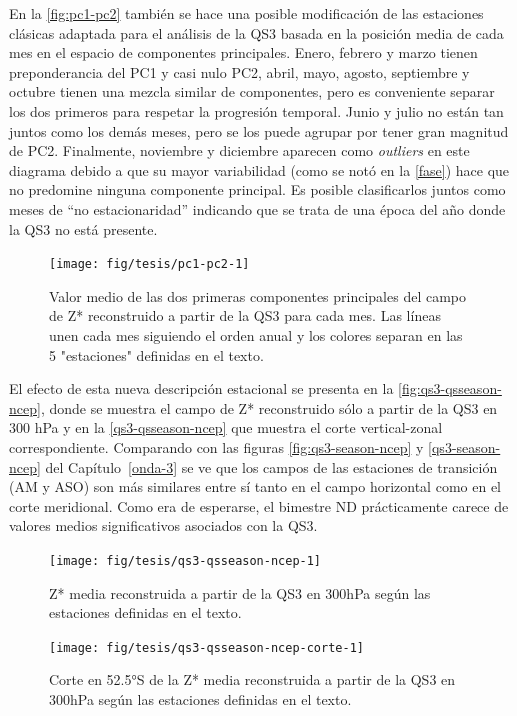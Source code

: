 \documentclass[spanish,a4paper,12pt,oneside]{book}
\begin{document}
En la \autoref{fig:pc1-pc2} también se hace una posible modificación de
las estaciones clásicas adaptada para el análisis de la QS3 basada en la
posición media de cada mes en el espacio de componentes principales.
Enero, febrero y marzo tienen preponderancia del PC1 y casi nulo PC2,
abril, mayo, agosto, septiembre y octubre tienen una mezcla similar de
componentes, pero es conveniente separar los dos primeros para respetar
la progresión temporal. Junio y julio no están tan juntos como los demás
meses, pero se los puede agrupar por tener gran magnitud de PC2.
Finalmente, noviembre y diciembre aparecen como \emph{outliers} en este
diagrama debido a que su mayor variabilidad (como se notó en la
\autoref{fase}) hace que no predomine ninguna componente principal. Es
posible clasificarlos juntos como meses de ``no estacionaridad''
indicando que se trata de una época del año donde la QS3 no está
presente.

\begin{figure}
\texttt{[image: fig/tesis/pc1-pc2-1]} \caption{Valor medio de las dos primeras componentes principales del campo de Z* reconstruido a partir de la QS3 para cada mes. Las líneas unen cada mes siguiendo el orden anual y los colores separan en las 5 "estaciones" definidas en el texto.}\label{fig:pc1-pc2}
\end{figure}

El efecto de esta nueva descripción estacional se presenta en la
\autoref{fig:qs3-qsseason-ncep}, donde se muestra el campo de Z*
reconstruido sólo a partir de la QS3 en 300 hPa y en la
\autoref{qs3-qsseason-ncep} que muestra el corte vertical-zonal
correspondiente. Comparando con las figuras \ref{fig:qs3-season-ncep} y
\ref{qs3-season-ncep} del Capítulo~\ref{onda-3} se ve que los campos de
las estaciones de transición (AM y ASO) son más similares entre sí tanto
en el campo horizontal como en el corte meridional. Como era de
esperarse, el bimestre ND prácticamente carece de valores medios
significativos asociados con la QS3.

\begin{figure}
\texttt{[image: fig/tesis/qs3-qsseason-ncep-1]} \caption{Z* media reconstruida a partir de la QS3 en 300hPa según las estaciones definidas en el texto.}\label{fig:qs3-qsseason-ncep}
\end{figure}

\begin{figure}
\texttt{[image: fig/tesis/qs3-qsseason-ncep-corte-1]} \caption{Corte en 52.5°S de la Z* media reconstruida a partir de la QS3 en 300hPa según las estaciones definidas en el texto.}\label{fig:qs3-qsseason-ncep-corte}
\end{figure}
\end{document}

